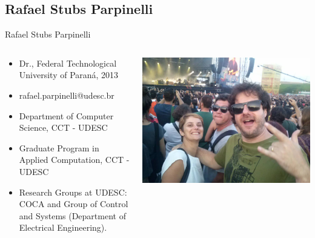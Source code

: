 \documentclass{beamer}
\begin{document}
\subsection{Rafael Stubs Parpinelli}
\begin{frame}{Rafael Stubs Parpinelli}

 \begin{columns}
 \begin{column}{0.5\textwidth} 
  \begin{itemize}
  \item Dr., Federal Technological University of Paran\'a, 2013
  \item rafael.parpinelli@udesc.br
  \item Department of Computer Science, CCT - UDESC
  \item Graduate Program in Applied Computation, CCT - UDESC
  \item Research Groups at UDESC: COCA and Group of Control and Systems (Department of Electrical Engineering).
\end{itemize}

 \end{column}
 
   \begin{column}{0.5\textwidth}  %
  \begin{flushright}
   \includegraphics[scale=0.18,keepaspectratio]{images/rafael.jpg} 
  \end{flushright} 
   \end{column} %
 \end{columns}
 
\end{frame}
 
\end{document}

